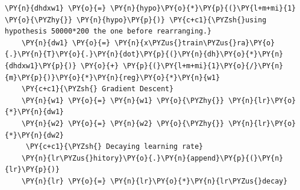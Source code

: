 \documentclass[a4paper,11pt]{article}%
\begin{document}
\begin{tcolorbox}[breakable, size=fbox, boxrule=1pt, pad at break*=1mm,colback=cellbackground, colframe=cellborder]
\begin{Verbatim}[commandchars=\\\{\}]
    \PY{n}{dhdxw1} \PY{o}{=} \PY{n}{hypo}\PY{o}{*}\PY{p}{(}\PY{l+m+mi}{1} \PY{o}{\PYZhy{}} \PY{n}{hypo}\PY{p}{)} \PY{c+c1}{\PYZsh{}using hypothesis 50000*200 the one before rearranging.}
    \PY{n}{dw1} \PY{o}{=} \PY{n}{x\PYZus{}train\PYZus{}ra}\PY{o}{.}\PY{n}{T}\PY{o}{.}\PY{n}{dot}\PY{p}{(}\PY{n}{dh}\PY{o}{*}\PY{n}{dhdxw1}\PY{p}{)} \PY{o}{+} \PY{p}{(}\PY{l+m+mi}{1}\PY{o}{/}\PY{n}{m}\PY{p}{)}\PY{o}{*}\PY{n}{reg}\PY{o}{*}\PY{n}{w1}    
    \PY{c+c1}{\PYZsh{} Gradient Descent}
    \PY{n}{w1} \PY{o}{=} \PY{n}{w1} \PY{o}{\PYZhy{}} \PY{n}{lr}\PY{o}{*}\PY{n}{dw1}
    \PY{n}{w2} \PY{o}{=} \PY{n}{w2} \PY{o}{\PYZhy{}} \PY{n}{lr}\PY{o}{*}\PY{n}{dw2}
     \PY{c+c1}{\PYZsh{} Decaying learning rate}
    \PY{n}{lr\PYZus{}hitory}\PY{o}{.}\PY{n}{append}\PY{p}{(}\PY{n}{lr}\PY{p}{)}
    \PY{n}{lr} \PY{o}{=} \PY{n}{lr}\PY{o}{*}\PY{n}{lr\PYZus{}decay}
\end{Verbatim}
\end{tcolorbox}
\end{document}
